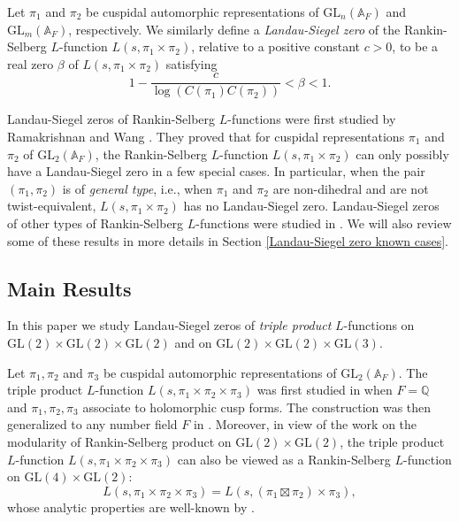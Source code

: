 \documentclass[12pt]{amsart}
\newcommand{\bA}{\mathbb{A}}
\newcommand{\bQ}{\mathbb{Q}}
\newcommand{\GL}{\text{GL}}
\begin{document}
Let $\pi_1$ and $\pi_2$ be cuspidal automorphic representations of $\GL_n(\bA_F)$ and $\GL_m(\bA_F)$, respectively. We similarly define a \textit{Landau-Siegel zero} of the Rankin-Selberg $L$-function $L(s,\pi_1 \times \pi_2)$, relative to a positive constant $c>0$, to be a real zero $\beta$ of $L(s,\pi_1 \times \pi_2)$ satisfying 
\begin{equation*}
    1-\frac{c}{\log (C(\pi_1)C(\pi_2))} < \beta < 1.
\end{equation*}

Landau-Siegel zeros of Rankin-Selberg $L$-functions were first studied by Ramakrishnan and Wang \cite{RamakrishnanWang2003}. They proved that for cuspidal representations $\pi_1$ and $\pi_2$ of $\GL_2(\bA_F)$, the Rankin-Selberg $L$-function $L(s,\pi_1 \times \pi_2)$ can only possibly have a Landau-Siegel zero in a few special cases. In particular, when the pair $(\pi_1,\pi_2)$ is of \textit{general type}, i.e., when $\pi_1$ and $\pi_2$ are non-dihedral and are not twist-equivalent, $L(s,\pi_1 \times \pi_2)$ has no Landau-Siegel zero. Landau-Siegel zeros of other types of Rankin-Selberg $L$-functions were studied in \cite{Luo2023}\cite{Thorner2025symmetricsquare}\cite{Thorner2025}. We will also review some of these results in more details in Section \ref{Landau-Siegel zero known cases}.

\subsection{Main Results}
In this paper we study Landau-Siegel zeros of \textit{triple product} $L$-functions on $\GL(2) \times \GL(2) \times \GL(2)$ and on $\GL(2) \times \GL(2) \times \GL(3)$.

Let $\pi_1,\pi_2$ and $\pi_3$ be cuspidal automorphic representations of $\GL_2(\bA_F)$. The triple product $L$-function $L(s,\pi_1 \times \pi_2 \times \pi_3)$ was first studied in \cite{Garrett1987} when $F = \bQ$ and $\pi_1,\pi_2,\pi_3$ associate to holomorphic cusp forms. The construction was then generalized to any number field $F$ in \cite{P-SRallis1987}. Moreover, in view of the work \cite{Ramakrishnan2000} on the modularity of Rankin-Selberg product on $\GL(2) \times \GL(2)$, the triple product $L$-function $L(s,\pi_1 \times \pi_2 \times \pi_3)$ can also be viewed as a Rankin-Selberg $L$-function on $\GL(4) \times \GL(2)$:
\begin{equation*}
    L(s,\pi_1 \times \pi_2 \times \pi_3) = L(s,(\pi_1 \boxtimes \pi_2) \times \pi_3),
\end{equation*}
whose analytic properties are well-known by \cite{JacquetP-SShalika1983}.
\end{document}
